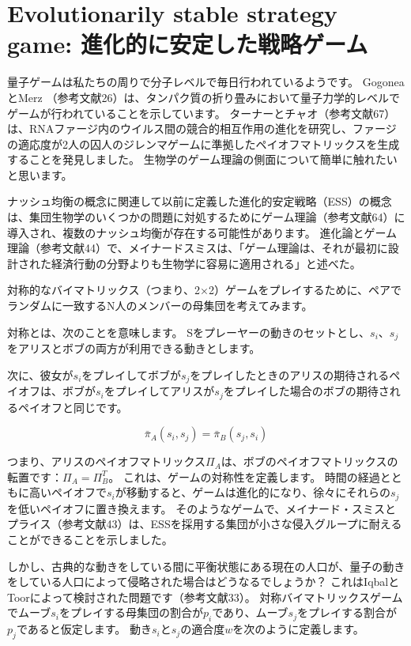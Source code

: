 \section{Evolutionarily stable strategy game: 進化的に安定した戦略ゲーム}

量子ゲームは私たちの周りで分子レベルで毎日行われているようです。 GogoneaとMerz （参考文献26）は、タンパク質の折り畳みにおいて量子力学的レベルでゲームが行われていることを示しています。 ターナーとチャオ（参考文献67）は、RNAファージ内のウイルス間の競合的相互作用の進化を研究し、ファージの適応度が2人の囚人のジレンマゲームに準拠したペイオフマトリックスを生成することを発見しました。 生物学のゲーム理論の側面について簡単に触れたいと思います。

ナッシュ均衡の概念に関連して以前に定義した進化的安定戦略（ESS）の概念は、集団生物学のいくつかの問題に対処するためにゲーム理論（参考文献64）に導入され、複数のナッシュ均衡が存在する可能性があります。
進化論とゲーム理論（参考文献44）で、メイナードスミスは、「ゲーム理論は、それが最初に設計された経済行動の分野よりも生物学に容易に適用される」と述べた。

対称的なバイマトリックス（つまり、2×2）ゲームをプレイするために、ペアでランダムに一致するN人のメンバーの母集団を考えてみます。

対称とは、次のことを意味します。 Sをプレーヤーの動きのセットとし、$s_i$、$s_j$をアリスとボブの両方が利用できる動きとします。

次に、彼女が$s_i$をプレイしてボブが$s_j$をプレイしたときのアリスの期待されるペイオフは、ボブが$s_i$をプレイしてアリスが$s_j$をプレイした場合のボブの期待されるペイオフと同じです。

\begin{equation}
\label{172}
\bar{\pi}_A (s_i, s_j) = \bar{\pi}_B (s_j, s_i)
\end{equation}

つまり、アリスのペイオフマトリックス$\Pi_A$は、ボブのペイオフマトリックスの転置です：$\Pi_A =　\Pi_B^T $。 これは、ゲームの対称性を定義します。 時間の経過とともに高いペイオフで$s_i$が移動すると、ゲームは進化的になり、徐々にそれらの$s_j$を低いペイオフに置き換えます。 そのようなゲームで、メイナード・スミスとプライス（参考文献43）は、ESSを採用する集団が小さな侵入グループに耐えることができることを示しました。

しかし、古典的な動きをしている間に平衡状態にある現在の人口が、量子の動きをしている人口によって侵略された場合はどうなるでしょうか？ これはIqbalとToorによって検討された問題です（参考文献33）。
対称バイマトリックスゲームでムーブ$s_i$をプレイする母集団の割合が$p_i$であり、ムーブ$s_j$をプレイする割合が$p_j$であると仮定します。 動き$s_i$と$s_j$の適合度$w$を次のように定義します。

